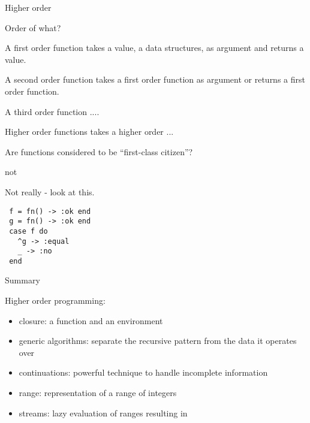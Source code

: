 \begin{frame}{Higher order}

Order of what?

\pause\vspace{20pt}
A first order function takes a value, a data structures, as argument and returns a value.

\pause\vspace{20pt}
A second order function takes a first order function as argument or returns a first order function.

\pause\vspace{20pt}
A third order function ....

\pause\vspace{20pt}
Higher order functions takes a higher order ...

\pause\vspace{20pt}
Are functions considered to be ``first-class citizen''?
\end{frame}

\begin{frame}[fragile]{not}
    
  \vspace{20pt}Not really - look at this.
    
\begin{verbatim}
 f = fn() -> :ok end
 g = fn() -> :ok end
 case f do
   ^g -> :equal
   _ -> :no
 end
\end{verbatim}

\end{frame}


\begin{frame}{Summary}

\pause Higher order programming:

\begin{itemize}
\pause\item {closure}: a function and an environment
\pause\item {generic algorithms}: separate the recursive pattern from the data it operates over
\pause\item {continuations}: powerful technique to handle incomplete information
\pause\item {range}: representation of a range of integers
\pause\item {streams}: lazy evaluation of ranges resulting in 
\end{itemize}


\end{frame}






